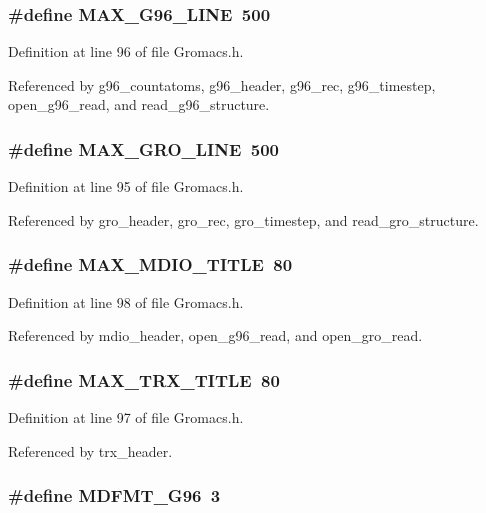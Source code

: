 \subsubsection{\setlength{\rightskip}{0pt plus 5cm}\#define MAX\_\-G96\_\-LINE\ 500}\label{Gromacs_8h_a21}




Definition at line 96 of file Gromacs.h.

Referenced by g96\_\-countatoms, g96\_\-header, g96\_\-rec, g96\_\-timestep, open\_\-g96\_\-read, and read\_\-g96\_\-structure.
\subsubsection{\setlength{\rightskip}{0pt plus 5cm}\#define MAX\_\-GRO\_\-LINE\ 500}\label{Gromacs_8h_a20}




Definition at line 95 of file Gromacs.h.

Referenced by gro\_\-header, gro\_\-rec, gro\_\-timestep, and read\_\-gro\_\-structure.
\subsubsection{\setlength{\rightskip}{0pt plus 5cm}\#define MAX\_\-MDIO\_\-TITLE\ 80}\label{Gromacs_8h_a23}




Definition at line 98 of file Gromacs.h.

Referenced by mdio\_\-header, open\_\-g96\_\-read, and open\_\-gro\_\-read.
\subsubsection{\setlength{\rightskip}{0pt plus 5cm}\#define MAX\_\-TRX\_\-TITLE\ 80}\label{Gromacs_8h_a22}




Definition at line 97 of file Gromacs.h.

Referenced by trx\_\-header.
\subsubsection{\setlength{\rightskip}{0pt plus 5cm}\#define MDFMT\_\-G96\ 3}\label{Gromacs_8h_a27}




